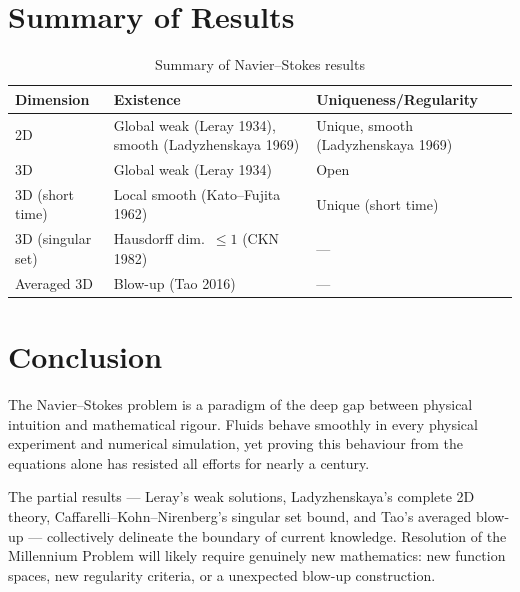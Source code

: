 \documentclass[12pt,a4paper]{article}
\theoremstyle{remark}
\begin{document}
\section{Summary of Results}

\begin{table}[h]
\centering
\begin{tabular}{lll}
\toprule
Dimension & Existence & Uniqueness/Regularity \\
\midrule
2D & Global weak (Leray 1934), smooth (Ladyzhenskaya 1969) & Unique, smooth (Ladyzhenskaya 1969) \\
3D & Global weak (Leray 1934)       & Open \\
3D (short time) & Local smooth (Kato--Fujita 1962) & Unique (short time) \\
3D (singular set) & Hausdorff dim.\ $\leq 1$ (CKN 1982) & --- \\
Averaged 3D & Blow-up (Tao 2016)     & --- \\
\bottomrule
\end{tabular}
\caption{Summary of Navier--Stokes results}
\end{table}

\section{Conclusion}

The Navier--Stokes problem is a paradigm of the deep gap between physical intuition
and mathematical rigour.  Fluids behave smoothly in every physical experiment and
numerical simulation, yet proving this behaviour from the equations alone has resisted
all efforts for nearly a century.

The partial results — Leray's weak solutions, Ladyzhenskaya's complete 2D theory,
Caffarelli--Kohn--Nirenberg's singular set bound, and Tao's averaged blow-up — collectively
delineate the boundary of current knowledge.  Resolution of the Millennium Problem will
likely require genuinely new mathematics: new function spaces, new regularity criteria,
or a unexpected blow-up construction.
\end{document}
